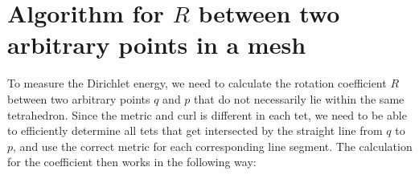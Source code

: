 \documentclass[../thesis.tex]{subfiles}
\begin{document}
\newcommand{\str}[1]{\textsc{#1}}
\newcommand{\var}[1]{\textit{#1}}
\def \ifempty#1{\def\temp{#1} \ifx\temp\empty }
\newcommand{\msg}[2]{\ensuremath{\ifempty{#2} [\str{#1}] \else [\str{#1}, {#2}] \fi}}
\newcommand{\tup}[1]{\ensuremath{\langle #1 \rangle}}
\newcommand{\nil}{\ensuremath{\bot}}
\newcommand{\false}{\textsc{false}\xspace}
\newcommand{\true}{\textsc{true}\xspace}

\newcommand\ts{\var{ts}\xspace}
\newcommand{\CK}{\ensuremath{\mathcal{K}}\xspace}
\newcommand{\CP}{\ensuremath{\mathcal{P}}\xspace}
\newcommand{\CQ}{\ensuremath{\mathcal{Q}}\xspace}

\chapter{Algorithm for $R$ between two arbitrary points in a mesh}
\label{ch:algorithm}
To measure the Dirichlet energy, we need to calculate the rotation coefficient $R$
between two arbitrary points $q$ and $p$ that do not necessarily lie within the same 
tetrahedron. Since the metric and curl is different in each tet, we need to be
able to efficiently determine all tets that get intersected by the straight
line from $q$ to $p$, and use the correct metric for each corresponding
line segment.
The calculation for the coefficient then works in the following way:
\end{document}
